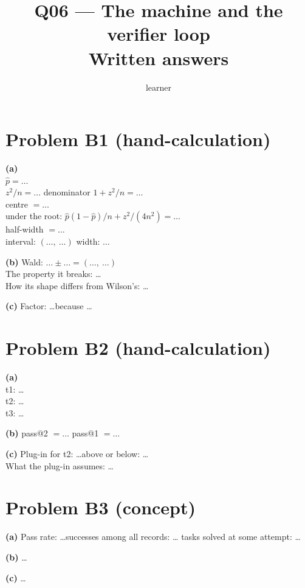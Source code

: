 \documentclass[11pt]{article}
\title{Q06 --- The machine and the verifier loop \\ \large Written answers}
\author{learner}
\date{}
\begin{document}
\maketitle

\section*{Problem B1 (hand-calculation)}\label{ans:B1}
\begin{answer}
\textbf{(a)} \\
$\hat p = \dots$ \\
$z^2/n = \dots$ \quad denominator $1 + z^2/n = \dots$ \\
centre $= \dots$ \\
under the root: $\hat p(1 - \hat p)/n + z^2/(4n^2) = \dots$ \\
half-width $= \dots$ \\
interval: $(\dots,\ \dots)$ \quad width: $\dots$

\textbf{(b)} Wald: $\dots \pm \dots = (\dots,\ \dots)$ \\
The property it breaks: \dots \\
How its shape differs from Wilson's: \dots

\textbf{(c)} Factor: \dots \quad because \dots
\end{answer}

\section*{Problem B2 (hand-calculation)}\label{ans:B2}
\begin{answer}
\textbf{(a)} \\
t1: \dots \\
t2: \dots \\
t3: \dots

\textbf{(b)} pass@2 $= \dots$ \quad pass@1 $= \dots$

\textbf{(c)} Plug-in for t2: \dots \quad above or below: \dots \\
What the plug-in assumes: \dots
\end{answer}

\section*{Problem B3 (concept)}\label{ans:B3}
\begin{answer}
\textbf{(a)} Pass rate: \dots \quad successes among all records: \dots \quad
tasks solved at some attempt: \dots

\textbf{(b)} \dots

\textbf{(c)} \dots
\end{answer}
\end{document}
